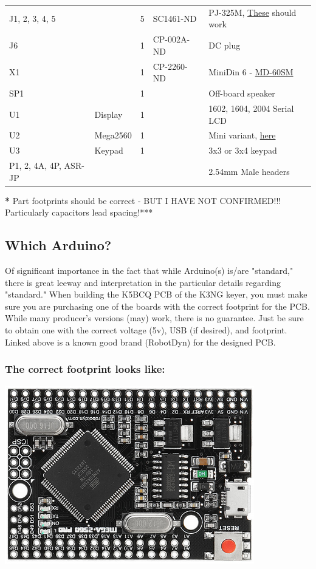 \documentclass[11pt]{article}
\begin{document}
\begin{center}
\begin{tabular}{llrll}
J1, 2, 3, 4, 5 &  & 5 & SC1461-ND & PJ-325M, \href{https://www.digikey.com/product-detail/en/switchcraft-inc/35RAPC4BV4/SC1461-ND/528670}{These} should work\\
J6 &  & 1 & CP-002A-ND & DC plug\\
X1 &  & 1 & CP-2260-ND & MiniDin 6 - \href{https://www.digikey.com/product-detail/en/cui-inc/MD-60SM/CP-2260-ND/96940}{MD-60SM}\\
SP1 &  & 1 &  & Off-board speaker\\
U1 & Display & 1 &  & 1602, 1604, 2004 Serial LCD\\
U2 & Mega2560 & 1 &  & Mini variant, \href{https://robotdyn.com/mega-2560-pro-mini-atmega2560-16au.html}{here}\\
U3 & Keypad & 1 &  & 3x3 or 3x4 keypad\\
P1, 2, 4A, 4P, ASR-JP &  &  &  & 2.54mm Male headers\\
\end{tabular}
\end{center}
\textbf{*} Part footprints should be correct - BUT I HAVE NOT CONFIRMED!!! Particularly capacitors lead spacing!***


\subsection{Which Arduino?}
\label{sec:org1529306}

Of significant importance in the fact that while Arduino(s) is/are "standard," there is great leeway and interpretation in the particular details regarding "standard."  When building the K5BCQ PCB of the K3NG keyer, you must make sure you are purchasing one of the boards with the correct footprint for the PCB.  While many producer's versions (may) work, there is no guarantee.  Just be sure to obtain one with the correct voltage (5v), USB (if desired), and footprint.  Linked above is a known good brand (RobotDyn) for the designed PCB.

\subsubsection{The \textbf{correct} footprint looks like:}
\label{sec:org980ffcc}
\begin{center}
\includegraphics[width=.9\linewidth]{../png/2.1/Correct2560.png}
\end{center}
\end{document}

